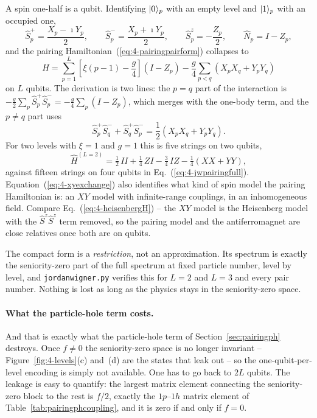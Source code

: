 A spin one-half is a qubit.  Identifying $\vert 0 \rangle_p$ with an empty level and
$\vert 1 \rangle_p$ with an occupied one,
\begin{equation}
  \hat{S}^{+}_p = \frac{X_p-\imath Y_p}{2},
  \qquad
  \hat{S}^{-}_p = \frac{X_p+\imath Y_p}{2},
  \qquad
  \hat{S}^{z}_p = -\frac{Z_p}{2},
  \qquad
  \hat{N}_p = I-Z_p ,
  \label{eq:4-pairqubit}
\end{equation}
and the pairing Hamiltonian~(\ref{eq:4-pairingpairform}) collapses to
\begin{equation}
  \boxed{\;
  \hat{H}
   = \sum_{p=1}^{L}\left[\xi(p-1)-\frac{g}{4}\right]
       \left(I-Z_p\right)
     - \frac{g}{4}\sum_{p<q}\left(X_pX_q+Y_pY_q\right) \;}
  \label{eq:4-jwpairingcompact}
\end{equation}
on $L$ qubits.  The derivation is two lines: the $p=q$ part of the
interaction is $-\tfrac{g}{2}\sum_p\hat{S}^{+}_p\hat{S}^{-}_p
=-\tfrac{g}{4}\sum_p(I-Z_p)$, which merges with the one-body term, and the
$p\ne q$ part uses
\begin{equation}
  \hat{S}^{+}_p\hat{S}^{-}_q + \hat{S}^{+}_q\hat{S}^{-}_p
   = \frac12\left(X_pX_q+Y_pY_q\right).
  \label{eq:4-xyexchange}
\end{equation}
For two levels with $\xi=1$ and $g=1$ this is five strings on two qubits,
\begin{equation}
  \hat{H}^{(L=2)}
   = \tfrac12\,II + \tfrac14\,ZI - \tfrac34\,IZ
     - \tfrac14\left(XX+YY\right),
  \label{eq:4-jwpairingtwolevels}
\end{equation}
against fifteen strings on four qubits in
Eq.~(\ref{eq:4-jwpairingfull}).  Equation~(\ref{eq:4-xyexchange}) also
identifies what kind of spin model the pairing Hamiltonian is: an $XY$ model
with infinite-range couplings, in an inhomogeneous field.  Compare
Eq.~(\ref{eq:4-heisenbergH}) -- the $XY$ model is the Heisenberg model with
the $\hat{S}^z\hat{S}^z$ term removed, so the pairing model and the
antiferromagnet are close relatives once both are on qubits.

The compact form is a \emph{restriction}, not an approximation.  Its spectrum
is exactly the seniority-zero part of the full spectrum at fixed particle
number, level by level, and \texttt{jordanwigner.py} verifies this for $L=2$
and $L=3$ and every pair number.  Nothing is lost as long as the physics stays
in the seniority-zero space.

\paragraph{What the particle-hole term costs.}
And that is exactly what the particle-hole term of
Section~\ref{sec:pairingph} destroys.  Once $f\ne0$ the seniority-zero space
is no longer invariant -- Figure~\ref{fig:4-levels}(c) and~(d) are the states
that leak out -- so the one-qubit-per-level encoding is simply not available.
One has to go back to $2L$ qubits.  The leakage is easy to quantify: the
largest matrix element connecting the seniority-zero block to the rest is
$f/2$, exactly the $1p$--$1h$ matrix element of
Table~\ref{tab:pairingphcoupling}, and it is zero if and only if $f=0$.

